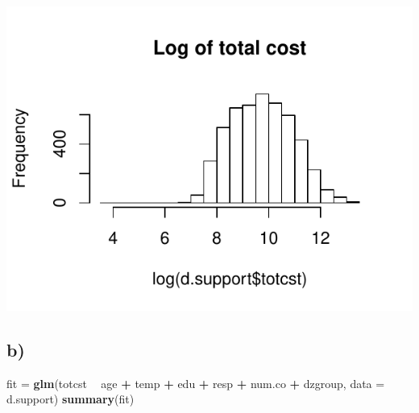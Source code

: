 \documentclass[
]{article}
\newenvironment{Shaded}{\begin{snugshade}}{\end{snugshade}}
\newcommand{\CommentTok}[1]{\textcolor[rgb]{0.56,0.35,0.01}{\textit{#1}}}
\newcommand{\DataTypeTok}[1]{\textcolor[rgb]{0.13,0.29,0.53}{#1}}
\newcommand{\KeywordTok}[1]{\textcolor[rgb]{0.13,0.29,0.53}{\textbf{#1}}}
\newcommand{\NormalTok}[1]{#1}
\newcommand{\OperatorTok}[1]{\textcolor[rgb]{0.81,0.36,0.00}{\textbf{#1}}}
\newcommand{\OtherTok}[1]{\textcolor[rgb]{0.56,0.35,0.01}{#1}}
\newcommand{\StringTok}[1]{\textcolor[rgb]{0.31,0.60,0.02}{#1}}
\begin{document}
\begin{Shaded}
\end{Shaded}

\includegraphics{Eksamensbesvarelse_files/figure-latex/unnamed-chunk-16-1.pdf}

\begin{Shaded}
\end{Shaded}

\hypertarget{b-2}{%
\subsection{b)}\label{b-2}}

\begin{Shaded}
\begin{Highlighting}[]
\NormalTok{fit =}\StringTok{ }\KeywordTok{glm}\NormalTok{(totcst }\OperatorTok{~}\StringTok{ }\NormalTok{age }\OperatorTok{+}\StringTok{ }\NormalTok{temp }\OperatorTok{+}\StringTok{ }\NormalTok{edu }\OperatorTok{+}\StringTok{ }\NormalTok{resp }\OperatorTok{+}\StringTok{ }\NormalTok{num.co }\OperatorTok{+}\StringTok{ }\NormalTok{dzgroup, }\DataTypeTok{data =}\NormalTok{ d.support)}
\KeywordTok{summary}\NormalTok{(fit)}
\end{Highlighting}
\end{Shaded}
\end{document}
